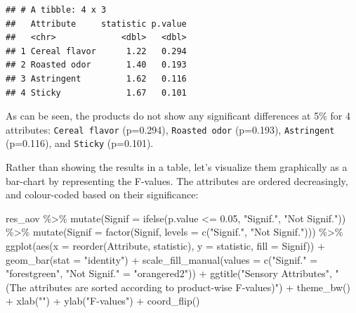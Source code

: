 \documentclass[
]{krantz}
\makeatletter
\newenvironment{Shaded}{\begin{snugshade}}{\end{snugshade}}
\newcommand{\AttributeTok}[1]{\textcolor[rgb]{0.61,0.61,0.61}{#1}}
\newcommand{\FloatTok}[1]{\textcolor[rgb]{0.06,0.06,0.06}{#1}}
\newcommand{\FunctionTok}[1]{\textcolor[rgb]{0,0,0}{#1}}
\newcommand{\NormalTok}[1]{#1}
\newcommand{\OtherTok}[1]{\textcolor[rgb]{0.37,0.37,0.37}{#1}}
\newcommand{\SpecialCharTok}[1]{\textcolor[rgb]{0,0,0}{#1}}
\newcommand{\StringTok}[1]{\textcolor[rgb]{0.5,0.5,0.5}{#1}}
\newenvironment{kframe}{%
\medskip{}
\setlength{\fboxsep}{.8em}
 \def\at@end@of@kframe{}%
 \ifinner\ifhmode%
  \def\at@end@of@kframe{\end{minipage}}%
  \begin{minipage}{\columnwidth}%
 \fi\fi%
 \def\FrameCommand##1{\hskip\@totalleftmargin \hskip-\fboxsep
 \colorbox{shadecolor}{##1}\hskip-\fboxsep
     \hskip-\linewidth \hskip-\@totalleftmargin \hskip\columnwidth}%
 \MakeFramed {\advance\hsize-\width
   \@totalleftmargin\z@ \linewidth\hsize
   \@setminipage}}%
 {\par\unskip\endMakeFramed%
 \at@end@of@kframe}
\renewenvironment{Shaded}{\begin{kframe}}{\end{kframe}}
\makeatother
\begin{document}
\begin{verbatim}
## # A tibble: 4 x 3
##   Attribute     statistic p.value
##   <chr>             <dbl>   <dbl>
## 1 Cereal flavor      1.22   0.294
## 2 Roasted odor       1.40   0.193
## 3 Astringent         1.62   0.116
## 4 Sticky             1.67   0.101
\end{verbatim}

As can be seen, the products do not show any significant differences at 5\% for 4 attributes: \texttt{Cereal\ flavor} (p=0.294), \texttt{Roasted\ odor} (p=0.193), \texttt{Astringent} (p=0.116), and \texttt{Sticky} (p=0.101).

Rather than showing the results in a table, let's visualize them graphically as a bar-chart by representing the F-values. The attributes are ordered decreasingly, and colour-coded based on their significance:

\begin{Shaded}
\begin{Highlighting}[]
\NormalTok{res\_aov }\SpecialCharTok{\%\textgreater{}\%}
  \FunctionTok{mutate}\NormalTok{(}\AttributeTok{Signif =} \FunctionTok{ifelse}\NormalTok{(p.value }\SpecialCharTok{\textless{}=} \FloatTok{0.05}\NormalTok{, }\StringTok{"Signif."}\NormalTok{, }\StringTok{"Not Signif."}\NormalTok{)) }\SpecialCharTok{\%\textgreater{}\%}
  \FunctionTok{mutate}\NormalTok{(}\AttributeTok{Signif =} \FunctionTok{factor}\NormalTok{(Signif, }\AttributeTok{levels =} \FunctionTok{c}\NormalTok{(}\StringTok{"Signif."}\NormalTok{, }\StringTok{"Not Signif."}\NormalTok{))) }\SpecialCharTok{\%\textgreater{}\%}
  \FunctionTok{ggplot}\NormalTok{(}\FunctionTok{aes}\NormalTok{(}\AttributeTok{x =} \FunctionTok{reorder}\NormalTok{(Attribute, statistic), }\AttributeTok{y =}\NormalTok{ statistic, }\AttributeTok{fill =}\NormalTok{ Signif)) }\SpecialCharTok{+}
  \FunctionTok{geom\_bar}\NormalTok{(}\AttributeTok{stat =} \StringTok{"identity"}\NormalTok{) }\SpecialCharTok{+}
  \FunctionTok{scale\_fill\_manual}\NormalTok{(}\AttributeTok{values =} \FunctionTok{c}\NormalTok{(}\StringTok{"Signif."} \OtherTok{=} \StringTok{"forestgreen"}\NormalTok{, }\StringTok{"Not Signif."} \OtherTok{=} \StringTok{"orangered2"}\NormalTok{)) }\SpecialCharTok{+}
  \FunctionTok{ggtitle}\NormalTok{(}\StringTok{"Sensory Attributes"}\NormalTok{, }\StringTok{"(The attributes are sorted according to product{-}wise F{-}values)"}\NormalTok{) }\SpecialCharTok{+}
  \FunctionTok{theme\_bw}\NormalTok{() }\SpecialCharTok{+}
  \FunctionTok{xlab}\NormalTok{(}\StringTok{""}\NormalTok{) }\SpecialCharTok{+}
  \FunctionTok{ylab}\NormalTok{(}\StringTok{"F{-}values"}\NormalTok{) }\SpecialCharTok{+}
  \FunctionTok{coord\_flip}\NormalTok{()}
\end{Highlighting}
\end{Shaded}
\end{document}

